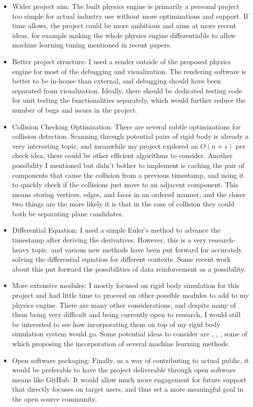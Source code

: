 \documentclass[12pt,a4paper,twoside,openright]{report}
\begin{document}
\begin{itemize}
\item Wider project aim: The built physics engine is primarily a personal project too simple for actual industry use without more optimizations and support. If time allows, the project could be more ambitious and aims at more recent ideas, for example making the whole physics engine differentiable to allow machine learning tuning mentioned in recent papers\cite{degrave2019differentiable}. 
\item Better project structure: I used a render outside of the proposed physics engine for most of the debugging and visualization. The rendering software is better to be in-house than external, and debugging should have been separated from visualization. Ideally, there should be dedicated testing code for unit testing the functionalities separately, which would further reduce the number of bugs and issues in the project.
\item Collision Checking Optimization: There are several subtle optimizations for collision detection. Scanning through potential pairs of rigid body is already a very interesting topic, and meanwhile my project explored an $O(n + s)$ per check idea, there could be other efficient algorithms to consider. Another possibility I mentioned but didn't bother to implement is caching the pair of components that cause the collision from a previous timestamp, and using it to quickly check if the collisions just move to an adjacent component. This means storing vertices, edges, and faces in an ordered manner, and the closer two things are the more likely it is that in the case of collision they could both be separating plane candidates.
\item Differential Equation: I used a simple Euler's method to advance the timestamp after deriving the derivatives. However, this is a very research-heavy topic, and various new methods have been put forward for accurately solving the differential equation for different contexts. Some recent work about this put forward the possibilities of data reinforcement\cite{koch2021data} as a possibility.
\item More extensive modules: I mostly focused on rigid body simulation for this project and had little time to proceed on other possible modules to add to my physics engine. There are many other considerations, and despite many of them being very difficult and being currently open to research, I would still be interested to see how incorporating them on top of my rigid body simulation system would go. Some potential ideas to consider are \cite{vinuesa2022enhancing}, \cite{obiols2020cfdnet}, \cite{li2022contact}, some of which proposing the incorporation of several machine learning methods.
\item Open software packaging: Finally, as a way of contributing to actual public, it would be preferable to have the project deliverable through open software means like GitHub. It would allow much more engagement for future support that directly focuses on target users, and thus set a more meaningful goal in the open source community.
\end{itemize}
\end{document}
